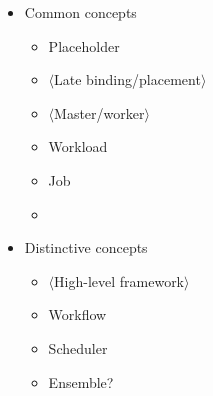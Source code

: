 \documentclass{sig-alternate}
\begin{document}
\begin{itemize}
	\item Common concepts
		\begin{itemize}
			\item Placeholder
			\item $\langle$Late binding/placement$\rangle$
			\item $\langle$Master/worker$\rangle$
			\item Workload
			\item Job
			\item \computeunit
		\end{itemize}
	\item Distinctive concepts
		\begin{itemize}
			\item $\langle$High-level framework$\rangle$
			\item Workflow
			\item Scheduler
			\item Ensemble?
		\end{itemize}
\end{itemize}
\end{document}
